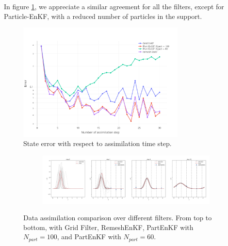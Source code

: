In figure \ref{fig:1d_error_time}, we appreciate a similar agreement for all the filters, except for Particle-EnKF, with a reduced number of particles in the support.

\begin{figure}
	\centering
	\includegraphics[width=0.75\textwidth]{images/app1d/wo_calibration/state_error.png}
	\caption{State error with respect to assimilation time step.}
	\label{fig:1d_error_time}
\end{figure}

\begin{figure}
	\centering
	\begin{subfigure}{\textwidth}
		\includegraphics[width=\textwidth]{images/app1d/wo_calibration/remesh_EnKF.png}
	\end{subfigure}
	\caption{Data assimilation comparison over different filters. From top to bottom, with Grid Filter, RemeshEnKF, PartEnKF with $N_{part}=100$, and PartEnKF with $N_{part}=60$.}
\end{figure}
\newpage

